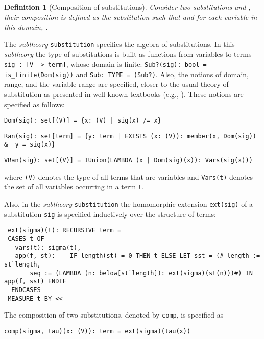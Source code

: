 \documentclass[submission,copyright,creativecommons]{eptcs}
\newtheorem{definition}{Definition}
\begin{document}
\begin{definition}[Composition of substitutions]
  Consider two substitutions  and , their composition
   is defined as the substitution 
  such that  and
  for each variable  in this domain, .
\end{definition}

The \emph{subtheory} {\tt substitution} specifies the algebra of
substitutions. In this \emph{subtheory} the type of substitutions is
built as functions from variables to terms {\tt sig : [V -> term]},
whose domain is finite: {\tt Sub?(sig): bool = is\_finite(Dom(sig))}
and {\tt Sub: TYPE = (Sub?)}. Also, the notions of domain, range, and
the variable range are specified, closer to the usual theory of
substitution as presented in well-known textbooks (e.g.,
\cite{BaNi98}).  These notions are specified as follows:

{\small
\begin{verbatim}
Dom(sig): set[(V)] = {x: (V) | sig(x) /= x}
\end{verbatim}
} {\small
\begin{verbatim}
Ran(sig): set[term] = {y: term | EXISTS (x: (V)): member(x, Dom(sig)) &  y = sig(x)}
\end{verbatim}
} {\small
\begin{verbatim}
VRan(sig): set[(V)] = IUnion(LAMBDA (x | Dom(sig)(x)): Vars(sig(x)))
\end{verbatim}
}

\noindent where {\tt (V)} denotes the type of all terms that are
variables and {\tt Vars(t)} denotes the set of all variables occurring
in a term {\tt t}.

Also, in the \emph{subtheory} {\tt substitution} the homomorphic
extension {\tt ext(sig)} of a substitution {\tt sig} is specified
inductively over the structure of terms:

{\small
\begin{verbatim}
 ext(sigma)(t): RECURSIVE term =   
 CASES t OF 
   vars(t): sigma(t),
   app(f, st):    IF length(st) = 0 THEN t ELSE LET sst = (# length := st`length,
       seq := (LAMBDA (n: below[st`length]): ext(sigma)(st(n)))#) IN app(f, sst) ENDIF
  ENDCASES
 MEASURE t BY <<
\end{verbatim}
}

The composition of two substitutions, denoted by {\tt comp}, is
specified as

{\small
\begin{verbatim}
comp(sigma, tau)(x: (V)): term = ext(sigma)(tau(x))
\end{verbatim}
}
\end{document}
